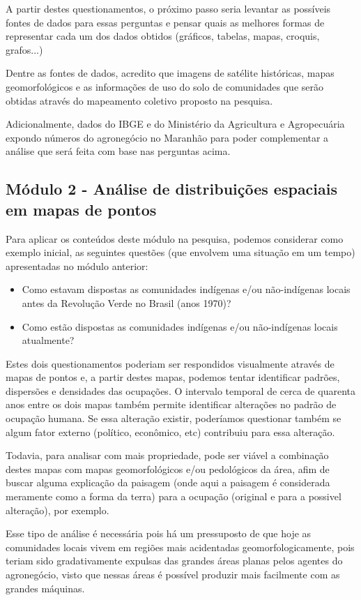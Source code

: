 A partir destes questionamentos, o próximo passo seria levantar as possíveis fontes de dados para essas perguntas e pensar quais as melhores formas de representar cada um dos dados obtidos (gráficos, tabelas, mapas, croquis, grafos...)

Dentre as fontes de dados, acredito que imagens de satélite históricas, mapas geomorfológicos e as informações de uso do solo de comunidades que serão obtidas através do mapeamento coletivo proposto na pesquisa.

Adicionalmente, dados do IBGE e do Ministério da Agricultura e Agropecuária expondo números do agronegócio no Maranhão para poder complementar a análise que será feita com base nas perguntas acima.

\subsection{Módulo 2 - Análise de distribuições espaciais em mapas de pontos}

Para aplicar os conteúdos deste módulo na pesquisa, podemos considerar como exemplo inicial, as seguintes questões (que envolvem uma situação em um tempo) apresentadas no módulo anterior:

\begin{itemize}
  \item Como estavam dispostas as comunidades indígenas e/ou não-indígenas locais antes da Revolução Verde no Brasil (anos 1970)?
  \item Como estão dispostas as comunidades indígenas e/ou não-indígenas locais atualmente?
\end{itemize}

Estes dois questionamentos poderiam ser respondidos visualmente através de mapas de pontos e, a partir destes mapas, podemos tentar identificar padrões, dispersões e densidades das ocupações. O intervalo temporal de cerca de quarenta anos entre os dois mapas também permite identificar alterações no padrão de ocupação humana. Se essa alteração existir, poderíamos questionar também se algum fator externo (político, econômico, etc) contribuiu para essa alteração.

Todavia, para analisar com mais propriedade, pode ser viável a combinação destes mapas com mapas geomorfológicos e/ou pedológicos da área, afim de buscar alguma explicação da paisagem (onde aqui a paisagem é considerada meramente como a forma da terra) para a ocupação (original e para a possivel alteração), por exemplo.

Esse tipo de análise é necessária pois há um pressuposto de que hoje as comunidades locais vivem em regiões mais acidentadas geomorfologicamente, pois teriam sido gradativamente expulsas das grandes áreas planas pelos agentes do agronegócio, visto que nessas áreas é possível produzir mais facilmente com as grandes máquinas. 

